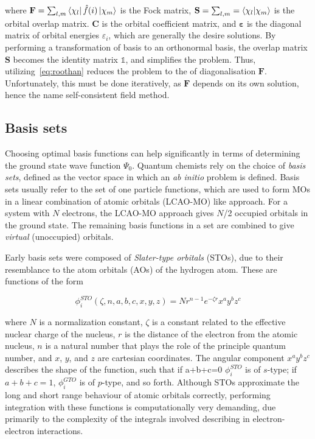 \noindent where $\mathbf{F} = \sum_{l,m} \bra{\chi_l} \hat{f}(i) \ket{\chi_m}$
is the Fock matrix, $\mathbf{S} = \sum_{l,m} = \bra{\chi_l}\ket{\chi_m}$ is the
orbital overlap matrix. $\mathbf{C}$ is the orbital coefficient matrix, and
$\mathbf{\varepsilon}$ is the diagonal matrix of orbital energies
$\varepsilon_i$, which are generally the desire solutions. By performing a
transformation of basis to an orthonormal basis, the overlap matrix
$\mathbf{S}$ becomes the identity matrix $\mathbb{1}$, and simplifies the
problem. Thus, utilizing~\ref{eq:roothan} reduces the problem to the of
diagonalisation $\mathbf{F}$. Unfortunately, this must be done iteratively, as
$\mathbf{F}$ depends on its own solution, hence the name self-consistent field
method.

\subsection{Basis sets}

Choosing optimal basis functions can help significantly in terms of determining
the ground state wave function $\Psi_0$. Quantum chemists rely on the choice of
\emph{basis sets}, defined as the vector space in which an \emph{ab initio}
problem is defined. Basis sets usually refer to the set of one particle
functions, which are used to form MOs in a linear combination of atomic
orbitals (LCAO-MO) like approach. For a system with $N$ electrons, the LCAO-MO
approach gives $N$/2 occupied orbitals in the ground state. The remaining basis
functions in a set are combined to give \emph{virtual} (unoccupied) orbitals.

Early basis sets were composed of \emph{Slater-type orbitals} (STOs), due to
their resemblance to the atom orbitals (AOs) of the hydrogen atom. These are
functions of the form

\begin{equation}
\phi_i^{STO}(\zeta,n,a,b,c,x,y,z) = Nr^{n-1}e^{-\zeta r}x^a y^b z^c
\end{equation}

\noindent where $N$ is a normalization constant, $\zeta$ is a constant related
to the effective nuclear charge of the nucleus, $r$ is the distance of the
electron from the atomic nucleus, $n$ is a natural number that plays the role
of the principle quantum number, and $x$, $y$, and $z$ are cartesian
coordinates. The angular component $x^a y^b z^c$ describes the shape of the
function, such that if a+b+c=0 $\phi_i^{STO}$ is of $s$-type; if $a+b+c=1$,
$\phi_i^{GTO}$ is of $p$-type, and so forth. Although STOs approximate the long
and short range behaviour of atomic orbitals correctly, performing integration
with these functions is computationally very demanding, due primarily to the
complexity of the integrals involved describing in electron-electron
interactions.

